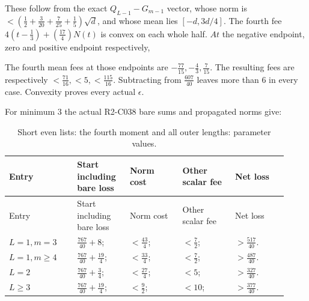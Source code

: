 These follow from the exact \(Q_{L-1}-G_{m-1}\) vector, whose norm is \(<(\frac{1}{2}+\frac{3}{20}+\frac{7}{25}+\frac{1}{5})\sqrt{d}\), and whose mean lies \([-d,\allowbreak \allowbreak 3d/4]\). The fourth fee \(4(t-\frac{1}{3})+(\frac{17}{4})N(t)\) is convex on each whole half. \(At\) the negative endpoint, zero and positive endpoint respectively,


The fourth mean fees at those endpoints are \(-\frac{77}{15},\allowbreak \allowbreak -\frac{4}{3},\allowbreak \allowbreak \frac{7}{15}\). The resulting fees are respectively \(<\frac{71}{16},\allowbreak \allowbreak <5,\allowbreak \allowbreak <\frac{115}{16}\). Subtracting from \(\frac{607}{40}\) leaves more than 6 in every case. Convexity proves every actual \(\epsilon\).

For minimum 3 the actual R2-C038 bare sums and propagated norms give:


\begingroup\small
\setlength{\tabcolsep}{3pt}
\setlength{\LTleft}{0pt}\setlength{\LTright}{\fill}
\begin{longtable}{@{}p{0.2200\linewidth}p{0.1750\linewidth}p{0.1750\linewidth}p{0.1750\linewidth}p{0.1750\linewidth}@{}}
\caption{Short even lists: the fourth moment and all outer lengths: parameter values.}\label{tab:parameters:r2-c041:3}\\
\toprule
Entry & Start including bare loss & Norm cost & Other scalar fee & Net loss \\
\midrule\endfirsthead
\toprule
Entry & Start including bare loss & Norm cost & Other scalar fee & Net loss \\
\midrule\endhead
\bottomrule\endfoot
\(L=1,\allowbreak \allowbreak m=3\) & \(\frac{767}{40}+8\); & \(<\frac{43}{4}\); & \(<\frac{7}{2}\); & \(>\frac{517}{40}\). \\
\addlinespace[2pt]
\(L=1,\allowbreak \allowbreak m\ge 4\) & \(\frac{767}{40}+\frac{19}{4}\); & \(<\frac{33}{4}\); & \(<\frac{7}{2}\); & \(>\frac{487}{40}\). \\
\addlinespace[2pt]
\(L=2\) & \(\frac{767}{40}+\frac{3}{4}\); & \(<\frac{27}{4}\); & \(<5\); & \(>\frac{327}{40}\). \\
\addlinespace[2pt]
\(L\ge 3\) & \(\frac{767}{40}+\frac{19}{4}\); & \(<\frac{9}{2}\); & \(<10\); & \(>\frac{377}{40}\). \\
\end{longtable}
\endgroup


